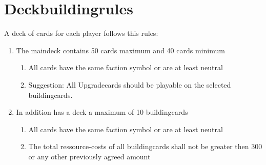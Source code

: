 \documentclass[a5paper,pagesize,10pt,bibtotoc,pointlessnumbers,
normalheadings,DIV=9,twoside=false]{scrbook}
\begin{document}
\chapter{Deckbuildingrules}

A deck of cards for each player follows this rules:

\begin{enumerate}
\item The maindeck contains 50 cards maximum and 40 cards minimum
\begin{enumerate}
\item All cards have the same faction symbol or are at least neutral
\item Suggestion: All Upgradecards should be playable on the selected buildingcards.
\end{enumerate}
\item In addition has a deck a maximum of 10 buildingcards
\begin{enumerate}
\item All cards have the same faction symbol or are at least neutral
\item The total ressource-costs of all buildingcards shall not be greater then 300 or any other previously agreed amount
\end{enumerate}
\end{enumerate}
\end{document}

